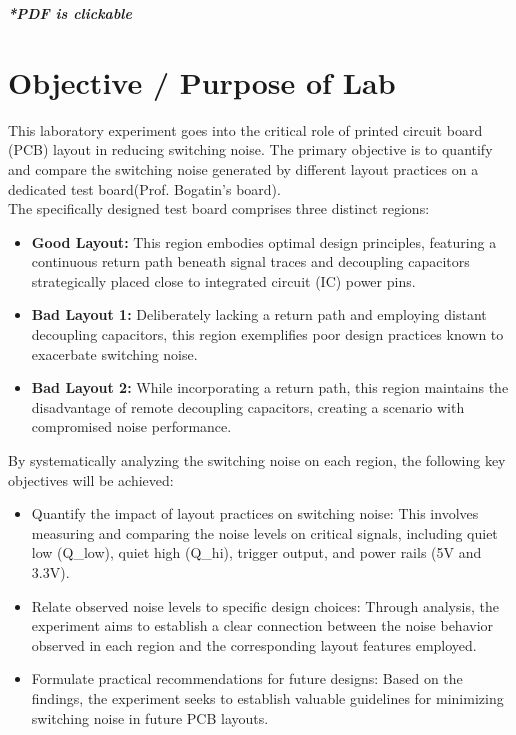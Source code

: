 \documentclass[a4paper,11pt]{article}%
\begin{document}


\pagebreak

\tableofcontents
\listoffigures
\listoftables
\vfill
\begin{center}
	\textbf{\textit{*PDF is clickable}}
\end{center}

\pagebreak

\section{Objective / Purpose of Lab}

This laboratory experiment goes into the critical role of printed circuit board (PCB) layout in reducing switching noise. The primary objective is to quantify and compare the switching noise generated by different layout practices on a dedicated test board(Prof. Bogatin's board).\\

The specifically designed test board comprises three distinct regions:

\begin{itemize}
	\item \textbf{Good Layout:} This region embodies optimal design principles, featuring a continuous return path beneath signal traces and decoupling capacitors strategically placed close to integrated circuit (IC) power pins.
	\item \textbf{Bad Layout 1:} Deliberately lacking a return path and employing distant decoupling capacitors, this region exemplifies poor design practices known to exacerbate switching noise.
	\item \textbf{Bad Layout 2:} While incorporating a return path, this region maintains the disadvantage of remote decoupling capacitors, creating a scenario with compromised noise performance.\\





\end{itemize}

By systematically analyzing the switching noise on each region, the following key objectives will be achieved:

\begin{itemize}
	\item Quantify the impact of layout practices on switching noise: This involves measuring and comparing the noise levels on critical signals, including quiet low (Q\_low), quiet high (Q\_hi), trigger output, and power rails (5V and 3.3V).
	\item Relate observed noise levels to specific design choices: Through analysis, the experiment aims to establish a clear connection between the noise behavior observed in each region and the corresponding layout features employed.
	\item Formulate practical recommendations for future designs: Based on the findings, the experiment seeks to establish valuable guidelines for minimizing switching noise in future PCB layouts.

\end{itemize}
\end{document}
